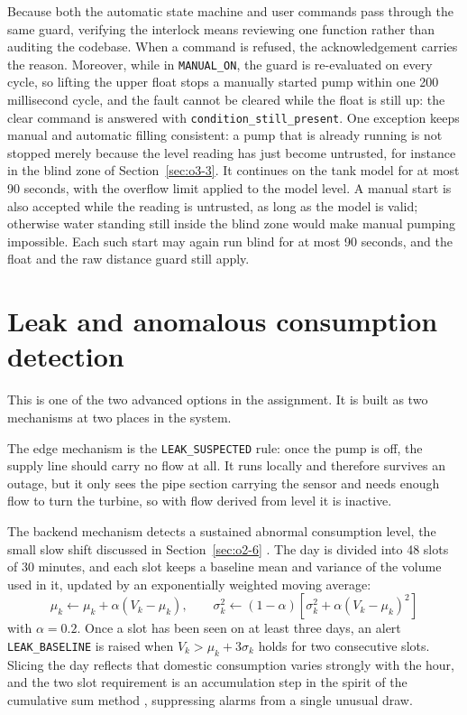 Because both the automatic state machine and user commands pass through the same guard, verifying the interlock means reviewing one function rather than auditing the codebase. When a command is refused, the acknowledgement carries the reason. Moreover, while in \texttt{MANUAL\_ON}, the guard is re-evaluated on every cycle, so lifting the upper float stops a manually started pump within one 200 millisecond cycle, and the fault cannot be cleared while the float is still up: the clear command is answered with \texttt{condition\_still\_present}. One exception keeps manual and automatic filling consistent: a pump that is already running is not stopped merely because the level reading has just become untrusted, for instance in the blind zone of Section~\ref{sec:o3-3}. It continues on the tank model for at most 90 seconds, with the overflow limit applied to the model level. A manual start is also accepted while the reading is untrusted, as long as the model is valid; otherwise water standing still inside the blind zone would make manual pumping impossible. Each such start may again run blind for at most 90 seconds, and the float and the raw distance guard still apply.

\section{Leak and anomalous consumption detection}
\label{sec:o6-6}

This is one of the two advanced options in the assignment. It is built as two mechanisms at two places in the system.

The edge mechanism is the \texttt{LEAK\_SUSPECTED} rule: once the pump is off, the supply line should carry no flow at all. It runs locally and therefore survives an outage, but it only sees the pipe section carrying the sensor and needs enough flow to turn the turbine, so with flow derived from level it is inactive.

The backend mechanism detects a sustained abnormal consumption level, the small slow shift discussed in Section~\ref{sec:o2-6} \cite{page1954}. The day is divided into 48 slots of 30 minutes, and each slot keeps a baseline mean and variance of the volume used in it, updated by an exponentially weighted moving average:
\begin{equation}
\mu_k \leftarrow \mu_k + \alpha (V_k - \mu_k), \qquad
\sigma^2_k \leftarrow (1-\alpha)\left[\sigma^2_k + \alpha (V_k - \mu_k)^2\right]
\label{eq:ewma}
\end{equation}
with $\alpha = 0.2$. Once a slot has been seen on at least three days, an alert \texttt{LEAK\_BASELINE} is raised when $V_k > \mu_k + 3\sigma_k$ holds for two consecutive slots. Slicing the day reflects that domestic consumption varies strongly with the hour, and the two slot requirement is an accumulation step in the spirit of the cumulative sum method \cite{page1954}, suppressing alarms from a single unusual draw.

